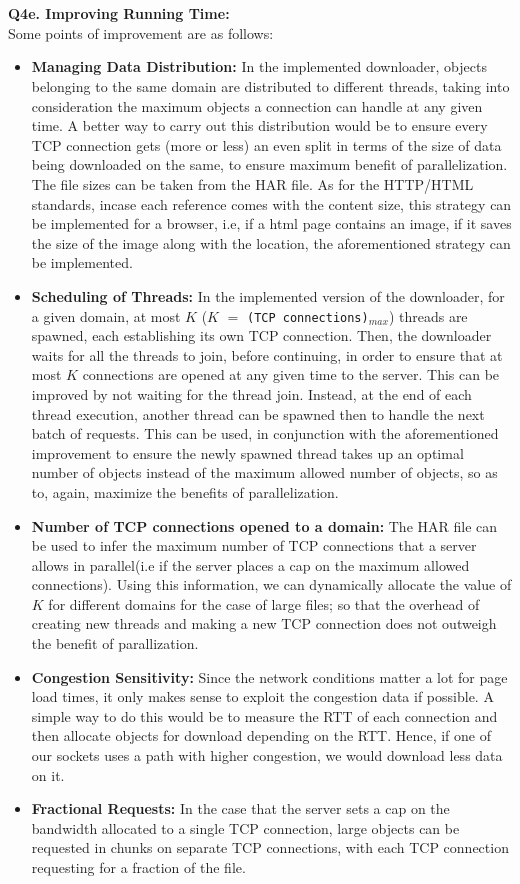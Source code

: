 \documentclass[12pt]{article}
\begin{document}
~\\\\
{\bfseries Q4e. Improving Running Time: }
\\ Some points of improvement are as follows:
\begin{itemize}
\item \textbf{Managing Data Distribution:} In the implemented downloader, objects belonging to the same domain are distributed to different threads, taking into consideration the maximum objects a connection can handle at any given time. A better way to carry out this distribution would be to ensure every TCP connection gets (more or less) an even split in terms of the size of data being downloaded on the same, to ensure maximum benefit of parallelization. The file sizes can be taken from the HAR file. As for the HTTP/HTML standards, incase each reference comes with the content size, this strategy can be implemented for a browser, i.e, if a html page contains an image, if it saves the size of the image along with the location, the aforementioned strategy can be implemented.
\item \textbf{Scheduling of Threads:} In the implemented version of the downloader, for a given domain, at most $K$ ($K$ $=$ \texttt{(TCP connections)$_{max}$}) threads are spawned, each establishing its own TCP connection. Then, the downloader waits for all the threads to join, before continuing, in order to ensure that at most $K$ connections are opened at any given time to the server. This can be improved by not waiting for the thread join. Instead, at the end of each thread execution, another thread can be spawned then to handle the next batch of requests. This can be used, in conjunction with the aforementioned improvement to ensure the newly spawned thread takes up an optimal number of objects instead of the maximum allowed number of objects, so as to, again, maximize the benefits of parallelization.  
\item \textbf{Number of TCP connections opened to a domain:} The HAR file can be used to infer the maximum number of TCP connections that a server allows in parallel(i.e if the server places a cap on the maximum allowed connections). Using this information, we can dynamically allocate the value of $K$ for different domains for the case of large files; so that the overhead of creating new threads and making a new TCP connection does not outweigh the benefit of parallization. 
\item \textbf{Congestion Sensitivity:} Since the network conditions matter a lot for page load times, it only makes sense to exploit the congestion data if possible. A simple way to do this would be to measure the RTT of each connection and then allocate objects for download depending on the RTT. Hence, if one of our sockets uses a path with higher congestion, we would download less data on it.
\item \textbf{Fractional Requests:} In the case that the server sets a cap on the bandwidth allocated to a single TCP connection, large objects can be requested in chunks on separate TCP connections, with each TCP connection requesting for a fraction of the file.
\end{itemize}
\end{document}
